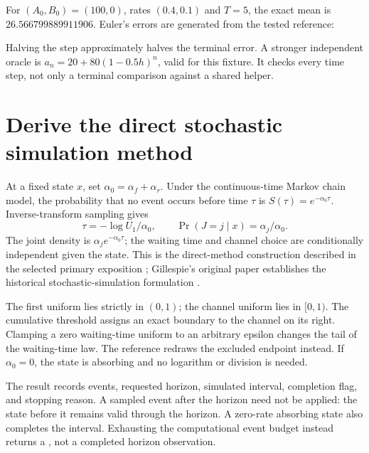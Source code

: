 For $(A_0,B_0)=(100,0)$, rates $(0.4,0.1)$ and $T=5$, the exact mean is
$26.566799889911906$. Euler's errors are generated from the tested reference:
\begin{center}\end{center}
Halving the step approximately halves the terminal error. A stronger independent
oracle is $a_n=20+80(1-0.5h)^n$, valid for this fixture. It checks every time
step, not only a terminal comparison against a shared helper.

\section{Derive the direct stochastic simulation method}
At a fixed state $x$, set $\alpha_0=\alpha_f+\alpha_r$. Under the continuous-time
Markov chain model, the probability that no event occurs before time $\tau$ is
$S(\tau)=e^{-\alpha_0\tau}$. Inverse-transform sampling gives
\[
\tau=-\log U_1/\alpha_0,\qquad
\Pr(J=j\mid x)=\alpha_j/\alpha_0.
\]
The joint density is $\alpha_j e^{-\alpha_0\tau}$; the waiting time and channel
choice are conditionally independent given the state. This is the direct-method
construction described in the selected primary exposition
\cite{higham2008}; Gillespie's original paper establishes the historical
stochastic-simulation formulation \cite{gillespie1977}.

The first uniform lies strictly in $(0,1)$; the channel uniform lies in $[0,1)$.
The cumulative threshold assigns an exact boundary to the channel on its right.
Clamping a zero waiting-time uniform to an arbitrary epsilon changes the tail of
the waiting-time law. The reference redraws the excluded endpoint instead.
If $\alpha_0=0$, the state is absorbing and no logarithm or division is needed.

The result records events, requested horizon, simulated interval, completion flag,
and stopping reason. A sampled event after the horizon need not be applied: the
state before it remains valid through the horizon. A zero-rate absorbing state
also completes the interval. Exhausting the computational event budget instead
returns a , not a completed horizon observation.

